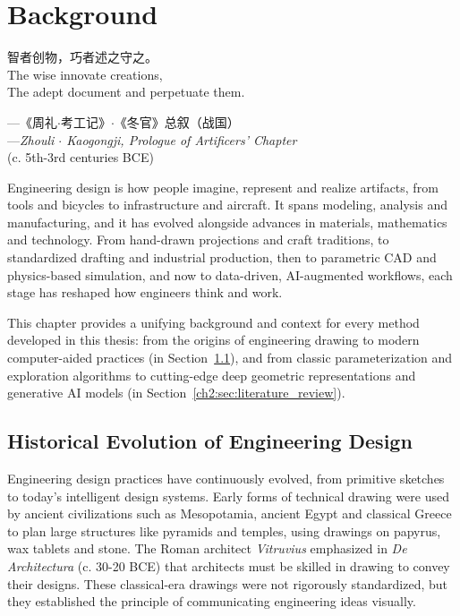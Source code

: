 \chapter{Background}
\label{ch2}

\setlength{\epigraphwidth}{0.55\textwidth} 
\begin{CJK*}{UTF8}{gbsn}
    \epigraph{
        智者创物，巧者述之守之。\\
        The wise innovate creations,\\
        The adept document and perpetuate them.
    }{
        ---《周礼$\cdot$考工记》$\cdot$《冬官》总叙（战国）\\
        ---\textit{Zhouli $\cdot$ Kaogongji,  Prologue of Artificers' Chapter} \\
        (c. 5th-3rd centuries BCE)
    } 
\end{CJK*}


Engineering design is how people imagine, represent and realize artifacts, from tools and bicycles to infrastructure and aircraft. It spans modeling, analysis and manufacturing, and it has evolved alongside advances in materials, mathematics and technology. From hand-drawn projections and craft traditions, to standardized drafting and industrial production, then to parametric CAD and physics-based simulation, and now to data-driven, AI-augmented workflows, each stage has reshaped how engineers think and work. 

This chapter provides a unifying background and context for every method developed in this thesis: from the origins of engineering drawing to modern computer-aided practices (in Section~\ref{ch2:sec:history}), and from classic parameterization and exploration algorithms to cutting-edge deep geometric representations and generative AI models (in Section~\ref{ch2:sec:literature_review}).

\section{Historical Evolution of Engineering Design}
\label{ch2:sec:history}

Engineering design practices have continuously evolved, from primitive sketches to today’s intelligent design systems. Early forms of technical drawing were used by ancient civilizations such as Mesopotamia, ancient Egypt and classical Greece to plan large structures like pyramids and temples, using drawings on papyrus, wax tablets and stone. The Roman architect \textit{Vitruvius} emphasized in \textit{De Architectura} (c. 30-20 BCE) that architects must be skilled in drawing to convey their designs. These classical-era drawings were not rigorously standardized, but they established the principle of communicating engineering ideas visually.

